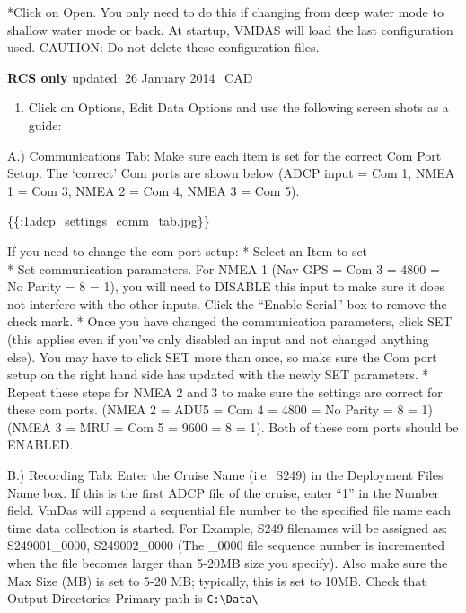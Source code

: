 \documentclass[]{book}
\providecommand{\tightlist}{%
  \setlength{\itemsep}{0pt}\setlength{\parskip}{0pt}}
\theoremstyle{definition}
\theoremstyle{definition}
\theoremstyle{definition}
\theoremstyle{remark}
\begin{document}
*Click on Open. You only need to do this if changing from deep water
mode to shallow water mode or back. At startup, VMDAS will load the last
configuration used. CAUTION: Do not delete these configuration files.

\textbf{RCS only} updated: 26 January 2014\_CAD

\begin{enumerate}
\def\labelenumi{\arabic{enumi}.}
\setcounter{enumi}{6}
\tightlist
\item
  Click on Options, Edit Data Options and use the following screen shots
  as a guide:
\end{enumerate}

A.) Communications Tab: Make sure each item is set for the correct Com
Port Setup. The `correct' Com ports are shown below (ADCP input = Com 1,
NMEA 1 = Com 3, NMEA 2 = Com 4, NMEA 3 = Com 5).

\{\{:1adcp\_settings\_comm\_tab.jpg\textbar{}\}\}

If you need to change the com port setup: * Select an Item to set\\
* Set communication parameters. For NMEA 1 (Nav GPS = Com 3 = 4800 = No
Parity = 8 = 1), you will need to DISABLE this input to make sure it
does not interfere with the other inputs. Click the ``Enable Serial''
box to remove the check mark. * Once you have changed the communication
parameters, click SET (this applies even if you've only disabled an
input and not changed anything else). You may have to click SET more
than once, so make sure the Com port setup on the right hand side has
updated with the newly SET parameters. * Repeat these steps for NMEA 2
and 3 to make sure the settings are correct for these com ports. (NMEA 2
= ADU5 = Com 4 = 4800 = No Parity = 8 = 1) (NMEA 3 = MRU = Com 5 = 9600
= 8 = 1). Both of these com ports should be ENABLED.

B.) Recording Tab: Enter the Cruise Name (i.e.~S249) in the Deployment
Files Name box. If this is the first ADCP file of the cruise, enter
``1'' in the Number field. VmDas will append a sequential file number to
the specified file name each time data collection is started. For
Example, S249 filenames will be assigned as: S249001\_0000,
S249002\_0000 (The \_0000 file sequence number is incremented when the
file becomes larger than 5-20MB size you specify). Also make sure the
Max Size (MB) is set to 5-20 MB; typically, this is set to 10MB. Check
that Output Directories Primary path is
\texttt{C:\textbackslash{}Data\textbackslash{}}
\end{document}

